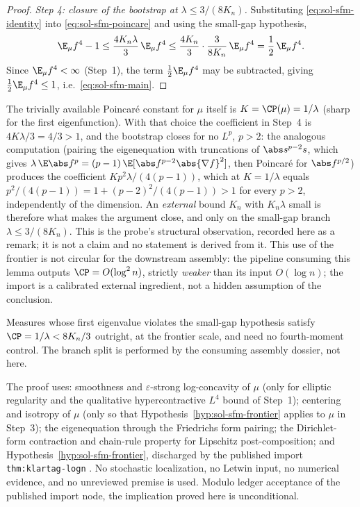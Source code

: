\documentclass[../main.tex]{subfiles}
\begin{document}
\begin{proof}
\medskip
\noindent\emph{Step 4: closure of the bootstrap at $\lambda\le3/(8K_n)$.}
Substituting \eqref{eq:sol-sfm-identity} into \eqref{eq:sol-sfm-poincare} and using the
small-gap hypothesis,
\[
  \E_\mu f^4-1
  \le\frac{4K_n\lambda}{3}\,\E_\mu f^4
  \le\frac{4K_n}{3}\cdot\frac{3}{8K_n}\,\E_\mu f^4
  =\frac12\,\E_\mu f^4 .
\]
Since $\E_\mu f^4<\infty$ (Step~1), the term $\tfrac12\E_\mu f^4$ may be subtracted,
giving $\tfrac12\E_\mu f^4\le1$, i.e.\ \eqref{eq:sol-sfm-main}.
\end{proof}

\begin{remark}
\label{rem:sol-sfm-no-self-bootstrap}
The trivially available Poincar\'e constant for $\mu$ itself is $K=\CP(\mu)=1/\lambda$
(sharp for the first eigenfunction).  With that choice the coefficient in Step~4 is
$4K\lambda/3=4/3>1$, and the bootstrap closes for no $L^p$, $p>2$: the analogous
computation (pairing the eigenequation with truncations of $\abs s^{p-2}s$, which gives
$\lambda\,\E\abs f^p=(p-1)\,\E[\abs f^{p-2}\abs{\nabla f}^2]$, then Poincar\'e for
$\abs f^{p/2}$) produces the coefficient $Kp^2\lambda/(4(p-1))$, which at $K=1/\lambda$
equals $p^2/(4(p-1))=1+(p-2)^2/(4(p-1))>1$ for every $p>2$, independently of the
dimension.  An \emph{external} bound $K_n$ with
$K_n\lambda$ small is therefore what makes the argument close, and only on the
small-gap branch $\lambda\le3/(8K_n)$.  This is the probe's structural observation,
recorded here as a remark; it is not a claim and no statement is derived from it.
This use of the frontier is not circular for the downstream assembly: the pipeline
consuming this lemma outputs $\CP=O(\log^2n)$, strictly \emph{weaker} than its input
$O(\log n)$; the import is a calibrated external ingredient, not a hidden assumption
of the conclusion.
\end{remark}

\begin{remark}
\label{rem:sol-sfm-large-gap}
Measures whose first eigenvalue violates the small-gap hypothesis satisfy
$\CP=1/\lambda<8K_n/3$ outright, at the frontier scale, and need no fourth-moment
control.  The branch split is performed by the consuming assembly dossier, not here.
\end{remark}

\begin{remark}
\label{rem:sol-sfm-hypotheses}
The proof uses: smoothness and $\varepsilon$-strong log-concavity of $\mu$ (only for
elliptic regularity and the qualitative hypercontractive $L^4$ bound of Step~1);
centering and isotropy of $\mu$ (only so that Hypothesis~\ref{hyp:sol-sfm-frontier}
applies to $\mu$ in Step~3); the eigenequation through the Friedrichs form pairing;
the Dirichlet-form contraction and chain-rule property for Lipschitz post-composition;
and Hypothesis~\ref{hyp:sol-sfm-frontier}, discharged by the published import
\texttt{thm:klartag-logn} \cite{Klartag2023Logarithmic}.  No stochastic localization,
no Letwin input, no numerical evidence, and no unreviewed premise is used.  Modulo
ledger acceptance of the published import node, the implication proved here is
unconditional.
\end{remark}
\end{document}
